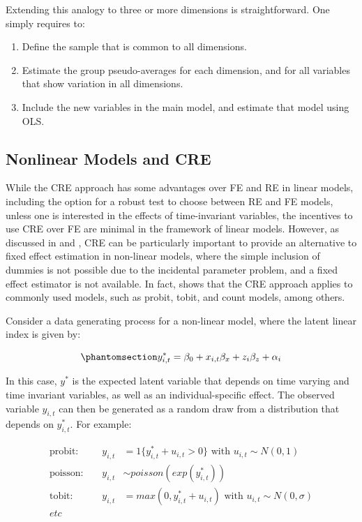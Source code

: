 \documentclass[bib]{statapress}
\providecommand{\tightlist}{%
  \setlength{\itemsep}{0pt}\setlength{\parskip}{0pt}}\usepackage{longtable,booktabs,array}
\begin{document}
Extending this analogy to three or more dimensions is straightforward.
One simply requires to:

\begin{enumerate}
\def\labelenumi{\arabic{enumi}.}
\tightlist
\item
  Define the sample that is common to all dimensions.
\item
  Estimate the group pseudo-averages for each dimension, and for all
  variables that show variation in all dimensions.
\item
  Include the new variables in the main model, and estimate that model
  using OLS.
\end{enumerate}

\subsection{Nonlinear Models and CRE}\label{nonlinear-models-and-cre}

While the CRE approach has some advantages over FE and RE in linear
models, including the option for a robust test to choose between RE and
FE models, unless one is interested in the effects of time-invariant
variables, the incentives to use CRE over FE are minimal in the
framework of linear models. However, as discussed in
\citet{wooldridge2019} and \citet{wooldridge2023}, CRE can be
particularly important to provide an alternative to fixed effect
estimation in non-linear models, where the simple inclusion of dummies
is not possible due to the incidental parameter problem, and a fixed
effect estimator is not available. In fact,
\citet{wooldridge2010econometric} shows that the CRE approach applies to
commonly used models, such as probit, tobit, and count models, among
others.

Consider a data generating process for a non-linear model, where the
latent linear index is given by:

\begin{equation}\phantomsection\label{eq-nl-1}{y^*_{i,t} = \beta_0 + x_{i,t}\beta_x + z_{i}\beta_z + \alpha_i
}\end{equation}

In this case, \(y^*\) is the expected latent variable that depends on
time varying and time invariant variables, as well as an
individual-specific effect. The observed variable \(y_{i,t}\) can then
be generated as a random draw from a distribution that depends on
\(y^*_{i,t}\). For example:

\[\begin{aligned}
\text{probit: } && y_{i,t} &= 1\{y^*_{i,t}+u_{i,t}>0\} \text{ with } u_{i,t}\sim N(0,1) \\ 
\text{poisson: } && y_{i,t} & \sim  poisson(exp(y^*_{i,t})) \\
\text{tobit: } && y_{i,t} &= max(0, y^*_{i,t}+u_{i,t}) \text{ with } u_{i,t}\sim N(0,\sigma) \\
etc
\end{aligned}
\]
\end{document}
